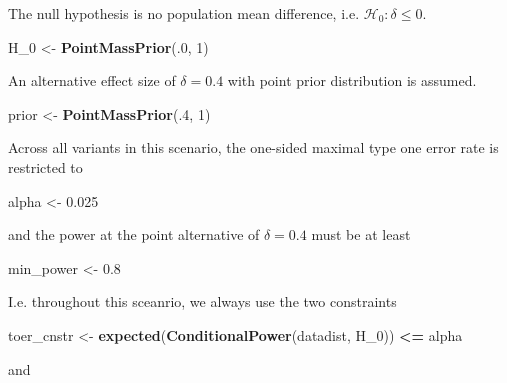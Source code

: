 \documentclass[]{book}
\newenvironment{Shaded}{\begin{snugshade}}{\end{snugshade}}
\newcommand{\DecValTok}[1]{\textcolor[rgb]{0.00,0.00,0.81}{#1}}
\newcommand{\FloatTok}[1]{\textcolor[rgb]{0.00,0.00,0.81}{#1}}
\newcommand{\KeywordTok}[1]{\textcolor[rgb]{0.13,0.29,0.53}{\textbf{#1}}}
\newcommand{\NormalTok}[1]{#1}
\newcommand{\OperatorTok}[1]{\textcolor[rgb]{0.81,0.36,0.00}{\textbf{#1}}}
\newcommand{\StringTok}[1]{\textcolor[rgb]{0.31,0.60,0.02}{#1}}
\begin{document}
The null hypothesis is no population mean difference, i.e.
\(\mathcal{H}_0:\delta \leq 0\).

\begin{Shaded}
\begin{Highlighting}[]
\NormalTok{H_}\DecValTok{0}\NormalTok{ <-}\StringTok{ }\KeywordTok{PointMassPrior}\NormalTok{(.}\DecValTok{0}\NormalTok{, }\DecValTok{1}\NormalTok{)}
\end{Highlighting}
\end{Shaded}

An alternative effect size of \(\delta = 0.4\) with
point prior distribution is assumed.

\begin{Shaded}
\begin{Highlighting}[]
\NormalTok{prior <-}\StringTok{ }\KeywordTok{PointMassPrior}\NormalTok{(.}\DecValTok{4}\NormalTok{, }\DecValTok{1}\NormalTok{)}
\end{Highlighting}
\end{Shaded}

Across all variants in this scenario, the one-sided maximal
type one error rate is restricted to

\begin{Shaded}
\begin{Highlighting}[]
\NormalTok{alpha <-}\StringTok{ }\FloatTok{0.025}
\end{Highlighting}
\end{Shaded}

and the power at the point alternative of \(\delta=0.4\) must
be at least

\begin{Shaded}
\begin{Highlighting}[]
\NormalTok{min_power <-}\StringTok{ }\FloatTok{0.8}
\end{Highlighting}
\end{Shaded}

I.e. throughout this sceanrio, we always use the two
constraints

\begin{Shaded}
\begin{Highlighting}[]
\NormalTok{toer_cnstr <-}\StringTok{ }\KeywordTok{expected}\NormalTok{(}\KeywordTok{ConditionalPower}\NormalTok{(datadist, H_}\DecValTok{0}\NormalTok{)) }\OperatorTok{<=}\StringTok{ }\NormalTok{alpha}
\end{Highlighting}
\end{Shaded}

and
\end{document}
